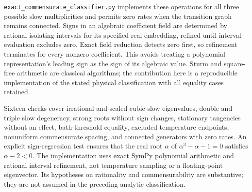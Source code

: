 \texttt{exact\_commensurate\_classifier.py} implements these operations for
all three possible slow multiplicities and permits zero rates when the
transition graph remains connected. Signs in an algebraic coefficient field
are determined by rational isolating intervals for its specified real
embedding, refined until interval evaluation excludes zero. Exact field
reduction detects zero first, so refinement terminates for every nonzero
coefficient. This avoids treating a polynomial representation's leading sign
as the sign of its algebraic value. Sturm and square-free arithmetic are
classical algorithms; the contribution here is a reproducible implementation
of the stated physical classification with all equality cases retained.

Sixteen checks cover irrational and scaled cubic slow eigenvalues, double and triple
slow degeneracy, strong roots without sign changes, stationary tangencies
without an effect, bath-threshold equality, excluded temperature endpoints,
nonuniform commensurate spacing, and connected generators with zero rates.
An explicit sign-regression test ensures that the real root $\alpha$ of
$\alpha^3-\alpha-1=0$ satisfies $\alpha-2<0$. The implementation uses exact
SymPy polynomial arithmetic and rational interval refinement, not temperature
sampling or a floating-point eigenvector. Its hypotheses on rationality and
commensurability are substantive; they are not assumed in the preceding
analytic classification.
